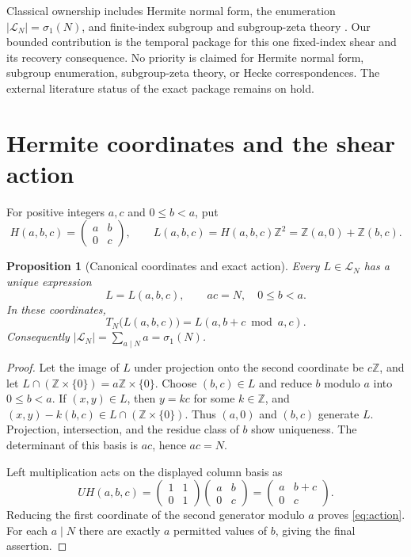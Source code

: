 \documentclass[11pt,a4paper]{amsart}
\newcommand{\Z}{\mathbb Z}
\newcommand{\cL}{\mathcal L}
\newtheorem{proposition}[theorem]{Proposition}
\begin{document}
Classical ownership includes Hermite normal form, the enumeration
$|\cL_N|=\sigma_1(N)$, and finite-index subgroup and subgroup-zeta theory
\citep{GrunewaldSegalSmith1988}.  Our bounded contribution is the temporal
package for this one fixed-index shear and its recovery consequence.  No
priority is claimed for Hermite normal form, subgroup enumeration,
subgroup-zeta theory, or Hecke correspondences.  The external literature
status of the exact package remains on hold.

\section{Hermite coordinates and the shear action}

For positive integers $a,c$ and $0\leq b<a$, put
\[
 H(a,b,c)=\begin{pmatrix}a&b\\0&c\end{pmatrix},
 \qquad
 L(a,b,c)=H(a,b,c)\Z^2=\Z(a,0)+\Z(b,c).
\]

\begin{proposition}[Canonical coordinates and exact action]
\label{prop:hnf}
Every $L\in\cL_N$ has a unique expression
\[
 L=L(a,b,c),\qquad ac=N,\quad 0\leq b<a.
\]
In these coordinates,
\begin{equation}
 \label{eq:action}
 T_N\bigl(L(a,b,c)\bigr)=L(a,b+c\bmod a,c).
\end{equation}
Consequently $|\cL_N|=\sum_{a\mid N}a=\sigma_1(N)$.
\end{proposition}

\begin{proof}
Let the image of $L$ under projection onto the second coordinate be
$c\Z$, and let
$L\cap(\Z\times\{0\})=a\Z\times\{0\}$.  Choose $(b,c)\in L$ and reduce
$b$ modulo $a$ into $0\leq b<a$.  If $(x,y)\in L$, then $y=kc$ for some
$k\in\Z$, and
$(x,y)-k(b,c)\in L\cap(\Z\times\{0\})$.  Thus $(a,0)$ and $(b,c)$
generate $L$.  Projection, intersection, and the residue class of $b$
show uniqueness.  The determinant of this basis is $ac$, hence $ac=N$.

Left multiplication acts on the displayed column basis as
\[
 U H(a,b,c)=
 \begin{pmatrix}1&1\\0&1\end{pmatrix}
 \begin{pmatrix}a&b\\0&c\end{pmatrix}
 =\begin{pmatrix}a&b+c\\0&c\end{pmatrix}.
\]
Reducing the first coordinate of the second generator modulo $a$ proves
\eqref{eq:action}.  For each $a\mid N$ there are exactly $a$ permitted
values of $b$, giving the final assertion.
\end{proof}
\end{document}
